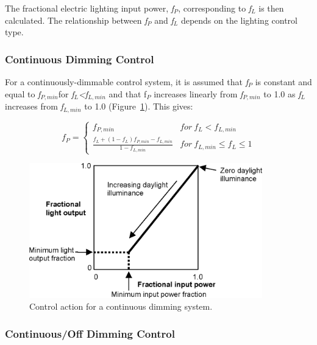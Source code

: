 The fractional electric lighting input power, \emph{f\(_{P}\)}, corresponding to \emph{f\(_{L}\)} is then calculated. The relationship between \emph{f\(_{P}\)} and \emph{f\(_{L}\)} depends on the lighting control type.

\subsubsection{Continuous Dimming Control}\label{continuous-dimming-control}

For a continuously-dimmable control system, it is assumed that \emph{f\(_{P}\)} is constant and equal to \emph{f\(_{P,min}\)}for \emph{f\(_{L}\)\textless{}f\(_{L,min}\)} and that f\(_{P}\) increases linearly from \emph{f\(_{P,min}\)} to 1.0 as \emph{f\(_{L}\)} increases from \emph{f\(_{L,min}\)} to 1.0 (Figure~\ref{fig:control-action-for-a-continuous-dimming}). This gives:

\begin{equation}
  f_P = \left\{
          \begin{array}{cl}
            f_{P,min} & for~f_L < f_{L,min} \\
            \frac{f_L + (1 - f_L)f_{P,min} - f_{L,min}}{1 - f_{L,min}} & for~f_{L,min} \le f_L \le 1
          \end{array}
        \right.
\end{equation}

\begin{figure}[hbtp] %
\centering
\includegraphics[width=0.9\textwidth, height=0.9\textheight, keepaspectratio=true]{media/image823.png}
\caption{Control action for a continuous dimming system. \protect \label{fig:control-action-for-a-continuous-dimming}}
\end{figure}

\subsubsection{Continuous/Off Dimming Control}\label{continuousoff-dimming-control}

